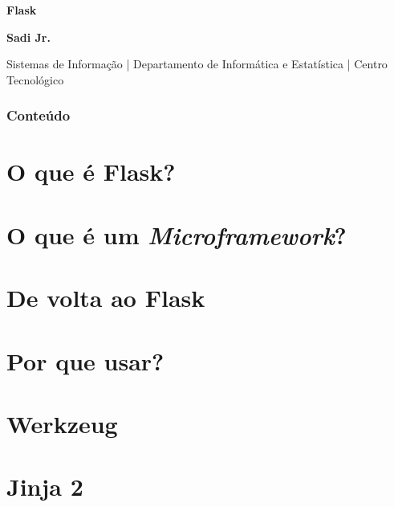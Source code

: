 \documentclass[t]{beamer}
\begin{document}
{
	\begin{frame}[plain]
		\vspace{18mm}
		\begin{flushright}
			\textcolor{cinza}{\textbf{\huge{
				Flask
			}}}
		\end{flushright}
		
		\vspace{-6mm}
		\begin{flushright}
			\textcolor{cinza}{\textbf{\scriptsize{
				Sadi Jr.
			}}}
		\end{flushright}
		
		\vspace{-7mm}
		\begin{flushright}
			\textcolor{cinza}{\scriptsize{
				Sistemas de Informação | Departamento de Informática e Estatística | Centro Tecnológico
			}}
		\end{flushright}
		
		
	\end{frame}
}

\begin{frame}
	\frametitle{Conteúdo}
	\tableofcontents
\end{frame}

\section{O que é Flask?}
\section{O que é um \textit{Microframework}?}
\section{De volta ao Flask}
\section{Por que usar?}
\section{Werkzeug}
\section{Jinja 2}
\end{document}
